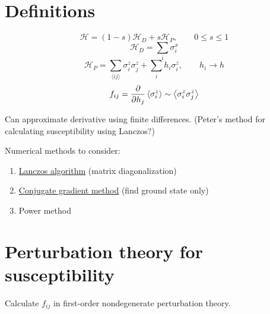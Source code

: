 %

\usepackage{hyperref}

\newcommand{\ham}{\mathcal{H}}
\newcommand{\nnsum}[2]{\sum_{\langle #1 #2 \rangle}}
\newcommand{\cc}{\mathrm{c.c.}}



\section*{Definitions}

\begin{equation}
  \ham = (1 - s) \ham_D + s \ham_P,
  \qquad
  0 \leq s \leq 1
  \label{def-h_qaa}
\end{equation}
\begin{equation}
  \ham_D = \sum_i \sigma^x_i
  \label{def-h_d}
\end{equation}
\begin{equation}
  \ham_P = \nnsum{i}{j} \sigma^z_i \sigma^z_j + \sum_i h_i \sigma^z_i,
  \qquad
  h_i \rightarrow h
  \label{def-h_p}
\end{equation}
\begin{equation}
  f_{ij} = \frac{\partial }{\partial h_j} \left< \sigma^z_i \right>
  \sim \left< \sigma^z_i \sigma^z_j \right>
  \label{def-f}
\end{equation}

Can approximate derivative using finite differences. (Peter's method for
calculating susceptibility using Lanczos?)

Numerical methods to consider:
\begin{enumerate}
  \item \href{http://en.wikipedia.org/wiki/Lanczos_algorithm}
    {Lanczos algorithm} (matrix diagonalization)
  \item \href{http://en.wikipedia.org/wiki/Conjugate_gradient_method}
    {Conjugate gradient method} (find ground state only)
  \item Power method
\end{enumerate}

\section*{Perturbation theory for susceptibility}

Calculate $f_{ij}$ in first-order nondegenerate perturbation theory.

